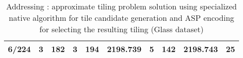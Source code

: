 \begin{table}[]
\begin{tabular}{rrrrrrrrrr}
6/224                                          & 3                                       & 182                                         & 3                      & 194                        & 2198.739                  & 5                                           & 142                                             & 2198.743                                       & 25  \\ \hline                                                 
\end{tabular}
\caption{Addressing \qsix: approximate tiling problem solution using specialized native algorithm for tile candidate generation and ASP encoding for selecting the resulting tiling (Glass dataset)}
\label{til:glass}
\end{table}

